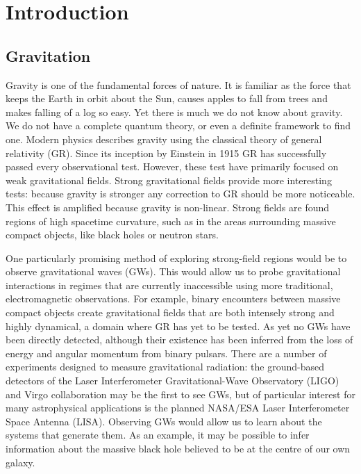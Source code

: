 \chapter{Introduction}\setcounter{page}{1}

\section{Gravitation}

Gravity is one of the fundamental forces of nature. It is familiar as the force that keeps the Earth in orbit about the Sun, causes apples to fall from trees and makes falling of a log so easy. Yet there is much we do not know about gravity. We do not have a complete quantum theory, or even a definite framework to find one. Modern physics describes gravity using the classical theory of general relativity (GR). Since its inception by Einstein in 1915 GR has successfully passed every observational test. However, these test have primarily focused on weak gravitational fields. Strong gravitational fields provide more interesting tests: because gravity is stronger any correction to GR should be more noticeable. This effect is amplified because gravity is non-linear. Strong fields are found regions of high spacetime curvature, such as in the areas surrounding massive compact objects, like black holes or neutron stars.

One particularly promising method of exploring strong-field regions would be to observe gravitational waves (GWs). This would allow us to probe gravitational interactions in regimes that are currently inaccessible using more traditional, electromagnetic observations. For example, binary encounters between massive compact objects create gravitational fields that are both intensely strong and highly dynamical, a domain where GR has yet to be tested. As yet no GWs have been directly detected, although their existence has been inferred from the loss of energy and angular momentum from binary pulsars. There are a number of experiments designed to measure gravitational radiation: the ground-based detectors of the Laser Interferometer Gravitational-Wave Observatory (LIGO) and Virgo collaboration may be the first to see GWs, but of particular interest for many astrophysical applications is the planned NASA/ESA Laser Interferometer Space Antenna (LISA). Observing GWs would allow us to learn about the systems that generate them. As an example, it may be possible to infer information about the massive black hole believed to be at the centre of our own galaxy.


